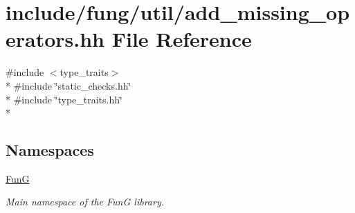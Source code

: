 \hypertarget{add__missing__operators_8hh}{}\section{include/fung/util/add\+\_\+missing\+\_\+operators.hh File Reference}
\label{add__missing__operators_8hh}
{\ttfamily \#include $<$type\+\_\+traits$>$}\\*
{\ttfamily \#include \char`\"{}static\+\_\+checks.\+hh\char`\"{}}\\*
{\ttfamily \#include \char`\"{}type\+\_\+traits.\+hh\char`\"{}}\\*
\subsection*{Namespaces}
\begin{DoxyCompactItemize}
\item 
 \hyperlink{namespaceFunG}{FunG}
\begin{DoxyCompactList}\small\item\em Main namespace of the FunG library. \end{DoxyCompactList}\end{DoxyCompactItemize}
